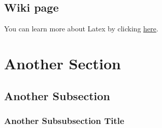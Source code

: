 \subsection{Wiki page}

You can learn more about Latex by clicking \href{http://en.wikibooks.org/wiki/LaTeX}{here}.


\section{Another Section}

\subsection{Another Subsection}

\subsubsection{Another Subsubsection Title}






